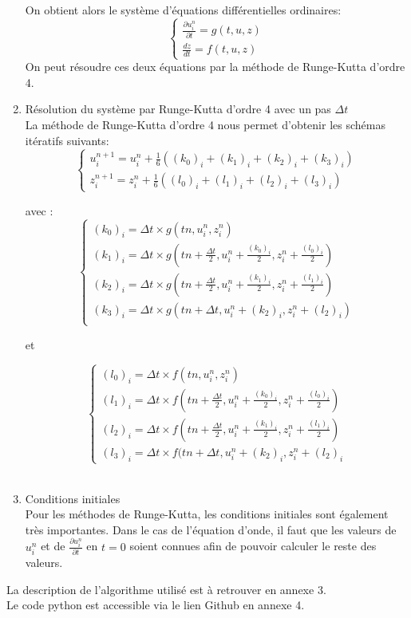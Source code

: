 \begin{enumerate}
    On obtient alors le système d'équations différentielles ordinaires:
      \[
      \begin{cases}
        \frac{\partial u^n_{i}}{\partial t}=g(t,u,z) \\
        \frac{dz}{dt}=f(t,u,z)
      \end{cases}
    \]
    On peut résoudre ces deux équations par la méthode de Runge-Kutta d'ordre 4.\\
    
    \item Résolution du système par Runge-Kutta d'ordre 4 avec un pas $\Delta t$\\
    
    La méthode de Runge-Kutta d'ordre 4 nous permet d'obtenir les schémas itératifs suivants:
     \[
      \begin{cases}
        u^{n+1}_{i}= u^n_{i} + \frac{1}{6}((k_0)_{i} +(k_1)_{i} + (k_2)_{i} +(k_3)_{i}) \\
        z^{n+1}_{i}= z^n_{i} + \frac{1}{6}((l_0)_{i} +(l_1)_{i} + (l_2)_{i} +(l_3)_{i})
      \end{cases}
    \]
    
    avec :
    \[
      \begin{cases}
        (k_0)_{i}=\Delta t \times g(tn,u^n_{i},z^n_{i})\\
        (k_1)_{i}=\Delta t \times g(tn + \frac{\Delta t}{2},u^n_{i} +\frac{(k_0)_{i}}{2},z^n_{i} +\frac{(l_0)_{i}}{2})\\
        (k_2)_{i}=\Delta t \times g(tn + \frac{\Delta t}{2},u^n_{i} +\frac{(k_1)_{i}}{2},z^n_{i} +\frac{(l_1)_{i}}{2})\\
        (k_3)_{i}=\Delta t \times g(tn + \Delta t,u^n_{i} +(k_2)_{i},z^n_{i} +(l_2)_{i})\\
      \end{cases}
    \]
    
    et 
    
     \[
      \begin{cases}
        (l_0)_{i}=\Delta t \times f(tn,u^n_{i},z^n_{i})\\
        (l_1)_{i}=\Delta t \times f(tn + \frac{\Delta t}{2},u^n_{i} +\frac{(k_0)_{i}}{2},z^n_{i} +\frac{(l_0)_{i}}{2})\\
        (l_2)_{i}=\Delta t \times f(tn + \frac{\Delta t}{2},u^n_{i} +\frac{(k_1)_{i}}{2},z^n_{i} +\frac{(l_1)_{i}}{2})\\
        (l_3)_{i}=\Delta t \times f(tn + \Delta t,u^n_{i} +(k_2)_{i},z^n_{i} +(l_2)_{i}
      \end{cases}
    \]\\
    
    \item Conditions initiales\\
    
Pour les méthodes de Runge-Kutta, les conditions initiales sont également très importantes.
Dans le cas de l'équation d'onde, il faut que les valeurs de $u^n_{i}$ et de $\frac{\partial u^n_{i}}{\partial t}$ en $t=0$ soient connues afin de pouvoir calculer le reste des valeurs.\\
    
\end{enumerate}
La description de l'algorithme utilisé est à retrouver en annexe 3.\\
Le code python est accessible via le lien Github en annexe 4.
